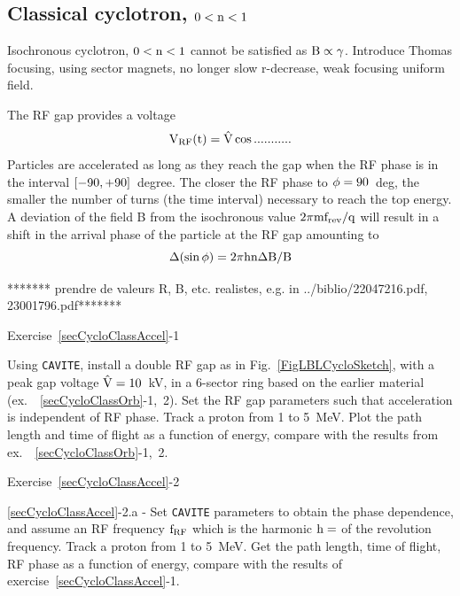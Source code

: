 \subsection{Classical cyclotron, $\rm 0<n<1$}


Isochronous cyclotron, $\rm 0<n<1$ cannot be satisfied as $\rm B\propto \gamma$. Introduce Thomas focusing, using sector magnets,
no longer slow r-decrease, weak focusing uniform field.



The RF gap provides a voltage  
\begin{equation} \rm
\label{EqRFVolt}
V_{\rm RF}(t) =\hat V \cos ........... 
\end{equation}
Particles are accelerated as long as they reach the gap when the RF phase is in the 
interval $\rm [-90,+90]$~degree. 
The closer the RF phase to $\rm \phi=90$~deg, the smaller the number of turns 
(the time interval) necessary to reach the top energy. 
A deviation of the field B from the isochronous value $\rm 2\pi m f_{\rm rev}/q$
will result in a  shift in the arrival phase of the particle at the RF gap amounting to 
\begin{equation} \rm
\label{EqPFPhaseCyclo}
\Delta (\sin \phi) = 2\pi h n \Delta B/B
\end{equation}

 ******* prendre de valeurs R, B, etc. realistes, e.g. in ../biblio/22047216.pdf, 23001796.pdf*******

\smallskip
\noindent {\small $\bullet$} Exercise~\ref{secCycloClassAccel}-1 

Using \texttt{CAVITE}, install a double RF gap as in Fig.~\ref{FigLBLCycloSketch}, 
with a peak gap voltage $\rm \hat V = 10$~kV, in a 6-sector ring based on the earlier material (ex.~~\ref{secCycloClassOrb}-1,~2). 
Set the RF gap parameters such that acceleration is independent of RF phase.
Track a proton from 1 to 5~MeV. Plot the path length and time of flight as a function of energy, 
compare with the results from ex.~~\ref{secCycloClassOrb}-1,~2.


\smallskip
\noindent {\small $\bullet$} Exercise~\ref{secCycloClassAccel}-2 

\noindent \ref{secCycloClassAccel}-2.a - 
Set \texttt{CAVITE} parameters to obtain the phase dependence, 
and assume an RF frequency $\rm f_{\rm RF}$ which is the harmonic $\rm h=$ of the revolution frequency.
Track a proton from 1 to 5~MeV. 
Get the path length, time of flight, RF phase as a function of energy,
compare with the results of exercise~\ref{secCycloClassAccel}-1.

